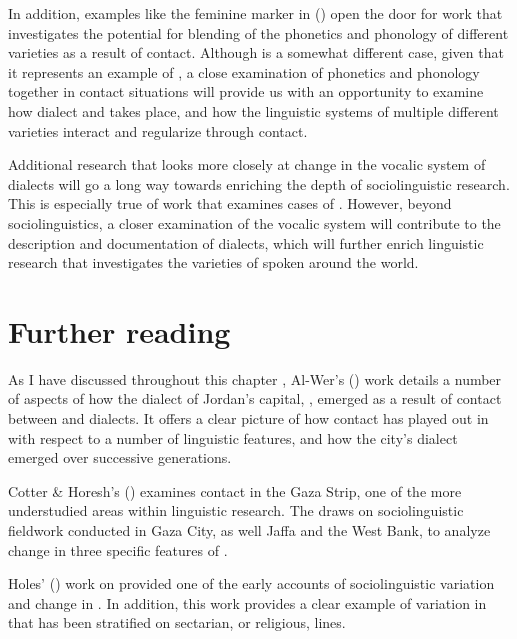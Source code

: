 \documentclass[output=paper]{langsci/langscibook}
\begin{document}
  In addition, examples like the feminine  marker in  (\citealt{Al-Wer2007}) open the door for  work that investigates the potential for blending of the phonetics and phonology of different  varieties as a result of contact. Although  is a somewhat different case, given that it represents an example of  , a close examination of phonetics and phonology together in contact situations will provide us with an opportunity to examine how dialect  and  takes place, and how the linguistic systems of multiple different  varieties interact and regularize through contact. 

  Additional research that looks more closely at change in the vocalic system of  dialects will go a long way towards enriching the depth of  sociolinguistic research. This is especially true of work that examines cases of . However, beyond sociolinguistics, a closer examination of the vocalic system will contribute to the description and documentation of  dialects, which will further enrich linguistic research that investigates the varieties of  spoken around the world. 

\section*{Further reading}
\begin{furtherreading}
\item[As I have discussed throughout this chapter], Al-Wer's (\citeyear{Al-Wer2007}) work details a number of aspects of how the dialect of Jordan’s capital, , emerged as a result of contact between  and  dialects. It offers a clear picture of how contact has played out in  with respect to a number of linguistic features, and how the city’s dialect emerged over successive generations. 
\item[Cotter \& Horesh’s (\citeyear{CotterHoresh2015})]  examines contact in the Gaza Strip, one of the more understudied areas within  linguistic research. The  draws on sociolinguistic fieldwork conducted in Gaza City, as well Jaffa and the West Bank, to analyze change in three specific features of  .
\item[Holes' (\citeyear{Holes1987})] work on  provided one of the early accounts of sociolinguistic variation and change in . In addition, this work provides a clear example of variation in  that has been stratified on sectarian, or religious, lines. 
\end{furtherreading}
\end{document}
